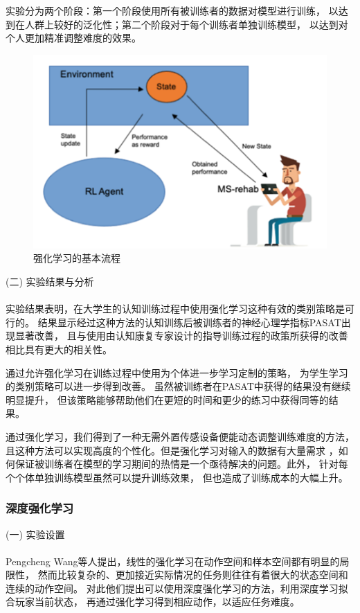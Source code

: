 \documentclass{article}
\begin{document}
            实验分为两个阶段：第一个阶段使用所有被训练者的数据对模型进行训练，
            以达到在人群上较好的泛化性；第二个阶段对于每个训练者单独训练模型，
            以达到对个人更加精准调整难度的效果。
            \begin{figure}[H]
            	
            	\centering
            	\includegraphics[scale=0.7]{images/RL_stage.png}
            	\caption{强化学习的基本流程}
            	\label{fig:label}
            \end{figure}
            (二) 实验结果与分析\paragraph{}
            实验结果表明，在大学生的认知训练过程中使用强化学习这种有效的类别策略是可行的。
            结果显示经过这种方法的认知训练后被训练者的神经心理学指标PASAT出现显著改善，
            且与使用由认知康复专家设计的指导训练过程的政策所获得的改善相比具有更大的相关性。

            通过允许强化学习在训练过程中使用为个体进一步学习定制的策略，
            为学生学习的类别策略可以进一步得到改善。
            虽然被训练者在PASAT中获得的结果没有继续明显提升，
            但该策略能够帮助他们在更短的时间和更少的练习中获得同等的结果。

            通过强化学习，我们得到了一种无需外置传感设备便能动态调整训练难度的方法，
            且这种方法可以实现高度的个性化。但是强化学习对输入的数据有大量需求
            ，如何保证被训练者在模型的学习期间的热情是一个亟待解决的问题。此外，
            针对每个个体单独训练模型虽然可以提升训练效果，
            但也造成了训练成本的大幅上升。

            \subsubsection{深度强化学习}
            (一) 实验设置\paragraph{}
            Pengcheng Wang\cite{ref13}等人提出，线性的强化学习在动作空间和样本空间都有明显的局限性，
            然而比较复杂的、更加接近实际情况的任务则往往有着很大的状态空间和连续的动作空间。
            对此他们提出可以使用深度强化学习的方法，利用深度学习拟合玩家当前状态，
            再通过强化学习得到相应动作，以适应任务难度。
\end{document}
